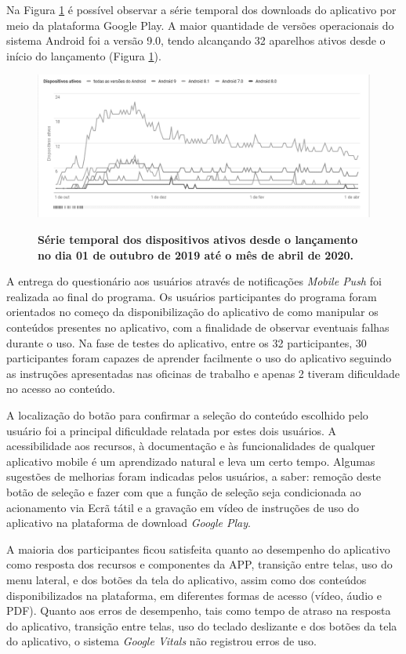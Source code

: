 Na Figura \ref{figura_43} é possível observar a série temporal dos downloads do aplicativo por meio da plataforma Google Play. A maior quantidade de versões operacionais do sistema Android foi a versão 9.0, tendo alcançando 32 aparelhos ativos desde o início do lançamento (Figura \ref{figura_43}).


\begin{figure}[H]
\caption{\textbf{Série temporal dos dispositivos ativos desde o lançamento no dia 01 de outubro de 2019 até o mês de abril de 2020.}}
\centering
\includegraphics[scale=0.6]{Imagens/dispositivos_instalados.png}
\label{figura_43}
\end{figure}

A entrega do questionário aos usuários através de notificações \textit{Mobile Push} foi realizada ao final do programa. Os usuários participantes do programa foram orientados no começo da disponibilização do aplicativo de como manipular os conteúdos presentes no aplicativo, com a finalidade de observar eventuais falhas durante o uso.
Na fase de testes do aplicativo, entre os 32 participantes, 30 participantes foram capazes de aprender facilmente o uso do aplicativo seguindo as instruções apresentadas nas oficinas de trabalho e apenas 2 tiveram dificuldade no acesso ao conteúdo.

A localização do botão para confirmar a seleção do conteúdo escolhido pelo usuário foi a principal dificuldade relatada por estes dois usuários. A acessibilidade aos recursos, à documentação e às funcionalidades de qualquer aplicativo mobile é um aprendizado natural e leva um certo tempo. Algumas sugestões de melhorias foram indicadas pelos usuários, a saber: remoção deste botão de seleção e fazer com que a função de seleção seja condicionada ao acionamento via Ecrã tátil e a gravação em vídeo de instruções de uso do aplicativo na plataforma de download \textit{Google Play}.

A maioria dos participantes ficou satisfeita quanto ao desempenho do aplicativo como resposta dos recursos e componentes da APP, transição entre telas, uso do menu lateral, e dos botões da tela do aplicativo, assim como dos conteúdos disponibilizados na plataforma, em diferentes formas de acesso (vídeo, áudio e PDF).
Quanto aos erros de desempenho, tais como tempo de atraso na resposta do aplicativo, transição entre telas, uso do teclado deslizante e dos botões da tela do aplicativo, o sistema \textit{Google Vitals} não registrou erros de uso.


